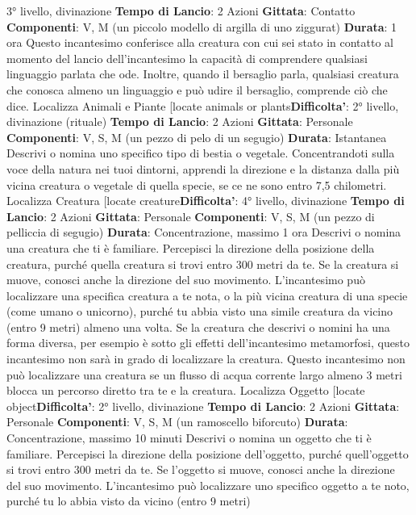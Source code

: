 \begin{multicols}{2}
3° livello, divinazione
\textbf{Tempo di Lancio}: 2 Azioni
\textbf{Gittata}: Contatto
\textbf{Componenti}: V, M (un piccolo modello di argilla di uno
ziggurat)
\textbf{Durata}: 1 ora
Questo incantesimo conferisce alla creatura con cui sei
stato in contatto al momento del lancio dell’incantesimo
la capacità di comprendere qualsiasi linguaggio parlata
che ode. Inoltre, quando il bersaglio parla, qualsiasi
creatura che conosca almeno un linguaggio e può udire
il bersaglio, comprende ciò che dice.
Localizza Animali e Piante
[locate animals or plants\textbf{Difficolta'}:
2° livello, divinazione (rituale)
\textbf{Tempo di Lancio}: 2 Azioni
\textbf{Gittata}: Personale
\textbf{Componenti}: V, S, M (un pezzo di pelo di un segugio)
\textbf{Durata}: Istantanea
Descrivi o nomina uno specifico tipo di bestia o
vegetale. Concentrandoti sulla voce della natura nei
tuoi dintorni, apprendi la direzione e la distanza dalla
più vicina creatura o vegetale di quella specie, se ce ne
sono entro 7,5 chilometri.
Localizza Creatura
[locate creature\textbf{Difficolta'}:
4° livello, divinazione
\textbf{Tempo di Lancio}: 2 Azioni
\textbf{Gittata}: Personale
\textbf{Componenti}: V, S, M (un pezzo di pelliccia di segugio)
\textbf{Durata}: Concentrazione, massimo 1 ora
Descrivi o nomina una creatura che ti è familiare.
Percepisci la direzione della posizione della creatura,
purché quella creatura si trovi entro 300 metri da te. Se
la creatura si muove, conosci anche la direzione del
suo movimento.
L’incantesimo può localizzare una specifica creatura a
te nota, o la più vicina creatura di una specie (come
umano o unicorno), purché tu abbia visto una simile
creatura da vicino (entro 9 metri) almeno una volta. Se
la creatura che descrivi o nomini ha una forma diversa,
per esempio è sotto gli effetti dell’incantesimo
metamorfosi, questo incantesimo non sarà in grado di
localizzare la creatura.
Questo incantesimo non può localizzare una creatura
se un flusso di acqua corrente largo almeno 3 metri
blocca un percorso diretto tra te e la creatura.
Localizza Oggetto
[locate object\textbf{Difficolta'}:
2° livello, divinazione
\textbf{Tempo di Lancio}: 2 Azioni
\textbf{Gittata}: Personale
\textbf{Componenti}: V, S, M (un ramoscello biforcuto)
\textbf{Durata}: Concentrazione, massimo 10 minuti
Descrivi o nomina un oggetto che ti è familiare.
Percepisci la direzione della posizione dell’oggetto,
purché quell’oggetto si trovi entro 300 metri da te. Se
l’oggetto si muove, conosci anche la direzione del suo
movimento.
L’incantesimo può localizzare uno specifico oggetto a te
noto, purché tu lo abbia visto da vicino (entro 9 metri)

\end{multicols}

